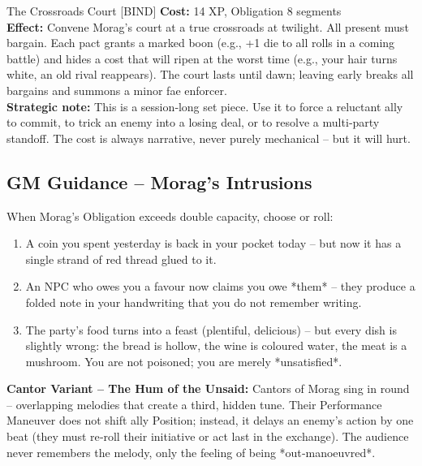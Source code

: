 \documentclass[10pt,a5paper]{book}
\begin{document}
\begin{patronbox}{The Crossroads Court [BIND]}
\textbf{Cost:} 14 XP, Obligation 8 segments \\
\textbf{Effect:} Convene Morag’s court at a true crossroads at twilight. All present must bargain. Each pact grants a marked boon (e.g., +1 die to all rolls in a coming battle) and hides a cost that will ripen at the worst time (e.g., your hair turns white, an old rival reappears). The court lasts until dawn; leaving early breaks all bargains and summons a minor fae enforcer. \\
\textbf{Strategic note:} This is a session‑long set piece. Use it to force a reluctant ally to commit, to trick an enemy into a losing deal, or to resolve a multi‑party standoff. The cost is always narrative, never purely mechanical – but it will hurt.
\end{patronbox}

\subsection*{GM Guidance – Morag’s Intrusions}

When Morag’s Obligation exceeds double capacity, choose or roll:
\begin{enumerate}
    \item A coin you spent yesterday is back in your pocket today – but now it has a single strand of red thread glued to it.
    \item An NPC who owes you a favour now claims you owe *them* – they produce a folded note in your handwriting that you do not remember writing.
    \item The party’s food turns into a feast (plentiful, delicious) – but every dish is slightly wrong: the bread is hollow, the wine is coloured water, the meat is a mushroom. You are not poisoned; you are merely *unsatisfied*.
\end{enumerate}

\noindent \textbf{Cantor Variant – The Hum of the Unsaid:}
Cantors of Morag sing in round – overlapping melodies that create a third, hidden tune. Their Performance Maneuver does not shift ally Position; instead, it delays an enemy’s action by one beat (they must re‑roll their initiative or act last in the exchange). The audience never remembers the melody, only the feeling of being *out‑manoeuvred*.

\clearpage

\end{document}
